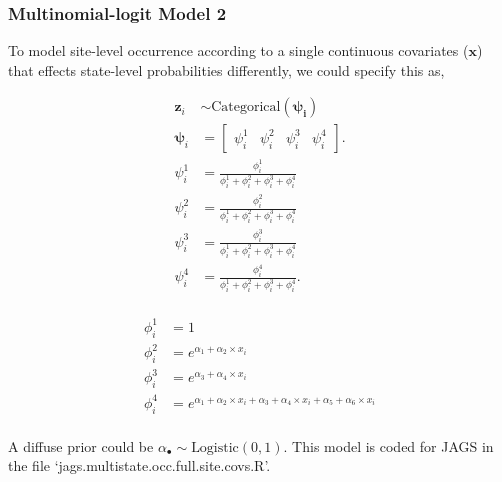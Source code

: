 \documentclass[12pt]{article}
\begin{document}
\subsubsection{Multinomial-logit Model 2}
To model site-level occurrence according to a single continuous covariates ($\mathbf{x}$) that effects state-level probabilities differently, we could specify this as,
\begin{center}
\begin{align*}
\textbf{z}_{i} &\sim \text{Categorical}(\boldsymbol{\psi_{i}})\\
\boldsymbol{\psi}_{i} &= \begin{bmatrix} \psi^1_{i} & \psi^2_{i} & \psi^3_{i} & \psi^4_{i} \end{bmatrix}.\\
\psi^1_{i} &=\frac{\phi^1_{i}}{\phi^1_{i}+ \phi^2_{i}+\phi^3_{i}+\phi^4_{i}}\\
\psi^2_{i} &=\frac{\phi^2_{i}}{\phi^1_{i}+ \phi^2_{i}+\phi^3_{i}+\phi^4_{i}}\\
\psi^3_{i} &=\frac{\phi^3_{i}}{\phi^1_{i}+ \phi^2_{i}+\phi^3_{i}+\phi^4_{i}}\\
\psi^4_{i} &=\frac{\phi^4_{i}}{\phi^1_{i}+ \phi^2_{i}+\phi^3_{i}+\phi^4_{i}}.\\
\end{align*}
\end{center}

\begin{center}
\begin{align*}
\phi^1_{i} &= 1\\
\phi^2_{i} &= e^{\alpha_{1}+\alpha_{2}\times x_{i}}\\
\phi^3_{i} &= e^{\alpha_{3}+\alpha_{4}\times x_{i}}\\
\phi^4_{i} &= e^{\alpha_{1}+\alpha_{2}\times x_{i}+\alpha_{3}+\alpha_{4}\times x_{i}+\alpha_{5}+\alpha_{6}\times x_{i}}\\
\end{align*}
\end{center}

A diffuse prior could be $\alpha_{\bullet} \sim \text{Logistic}(0,1).$ This model is coded for JAGS in the file `jags.multistate.occ.full.site.covs.R'.
\end{document}
